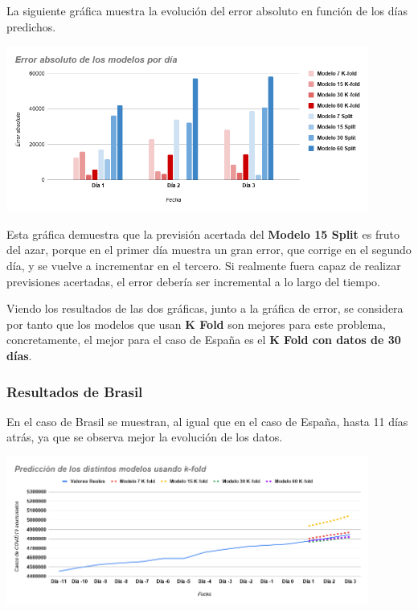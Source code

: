 \documentclass[12pt,a4paper, xcolor=table]{article}
\begin{document}
    \vspace{3mm}

    La siguiente gráfica muestra la evolución del error absoluto en función de los días predichos.

    \begin{center}
        \centering
        \includegraphics[width=450px]{img/error_modelos_ES.png}
    \end{center}

    Esta gráfica demuestra que la previsión acertada del \textbf{Modelo 15 Split} es fruto del azar, porque en el primer día muestra un gran error, que corrige en el segundo día, y se vuelve a incrementar en el tercero. Si realmente fuera capaz de realizar previsiones acertadas, el error debería ser incremental a lo largo del tiempo.

    \vspace{2mm}

    Viendo los resultados de las dos gráficas, junto a la gráfica de error, se considera por tanto que los modelos que usan \textbf{K Fold} son mejores para este problema, concretamente, el mejor para el caso de España es el \textbf{K Fold con datos de 30 días}.



    \subsubsection{Resultados de Brasil}

    En el caso de Brasil se muestran, al igual que en el caso de España, hasta 11 días atrás, ya que se observa mejor la evolución de los datos.

    \begin{center}
        \includegraphics[width=450px]{img/pred_modelos_kFold_BZ.png}
    \end{center}
\end{document}
